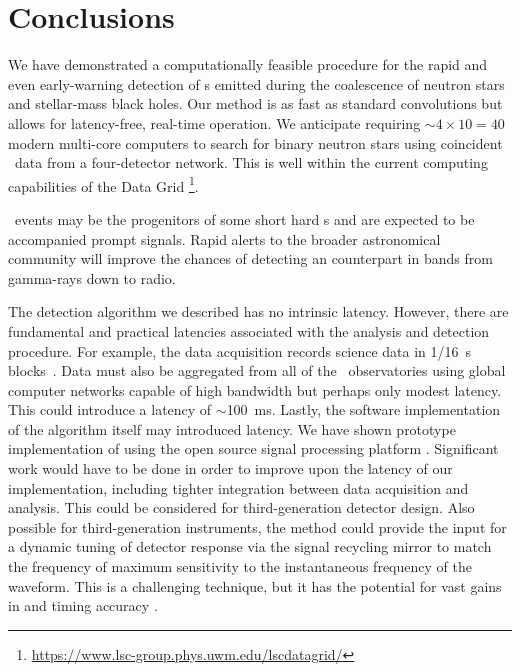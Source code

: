\section{Conclusions}
\label{sec:conclusions}

We have demonstrated a computationally feasible procedure for the rapid and
even early-warning detection of \GW{}s emitted during the coalescence
of neutron stars and stellar-mass black holes. Our method is as fast as
standard \fft{} convolutions but allows for latency-free, real-time
operation.  We anticipate requiring $\sim 4 \times 10 = 40$ modern multi-core computers to
search for binary neutron stars using coincident \GW\ data from a four-detector network.
This is well within the current computing capabilities of the \LIGO{} Data Grid%
\footnote{\url{https://www.lsc-group.phys.uwm.edu/lscdatagrid/}}.

\CBC\ events may be the progenitors of some short hard \GRB{}s and are
expected to be accompanied prompt \EM{} signals.  Rapid
alerts to the broader astronomical community will improve the chances of
detecting an \EM{} counterpart in bands from gamma-rays down to
radio.

The detection algorithm we described has no intrinsic latency.  However, there are
fundamental and practical latencies associated with the analysis and detection
procedure. For example, the \LIGO{} data acquisition records science data in 1/16~s
blocks~\citep{Bork2001}. Data must also be aggregated from all of the \GW\
observatories using global computer networks capable of high bandwidth but perhaps only
modest latency.  This could introduce a latency of $\sim$100~ms.  Lastly, the software
implementation of the algorithm itself may introduced latency.  We have shown 
prototype implementation of \lloid{} using the open source signal processing platform
\gstreamer. Significant work would have to be done in order to
improve upon the latency of our implementation, including tighter integration between
data acquisition and analysis. This could be considered for third-generation detector
design.
Also possible for third-generation instruments, the \lloid{} method could
provide the input for a dynamic tuning of detector response via the signal
recycling mirror to match the frequency of maximum sensitivity to the
instantaneous frequency of the \GW{} waveform.  This is a challenging technique, but
it has the potential for vast gains in \SNR{} and timing accuracy
\citep{PhysRevD.47.2184}.

\begin{comment}
In the future, this
could be improved upon further by conditionally reconstructing the \SNR{} time-series
only during times when a composite detection statistic crosses a
threshold~\citep{svd-compdetstat}.
\end{comment}

